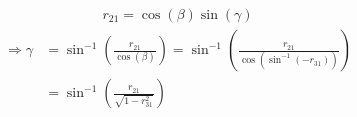\begin{equation*}
    r_{21} = \cos(\beta)\sin(\gamma)
\end{equation*}
\begin{align}
    \begin{split}
        \Rightarrow \gamma & = \sin^{-1}\left(\frac{r_{21}}{\cos(\beta)}\right)               = \sin^{-1}\left(\frac{r_{21}}{\cos(\sin^{-1}(-r_{31}))}\right) \\
        & = \sin^{-1}\left(\frac{r_{21}}{\sqrt{1-r_{31}^2}}\right)
    \end{split}
\end{align}


